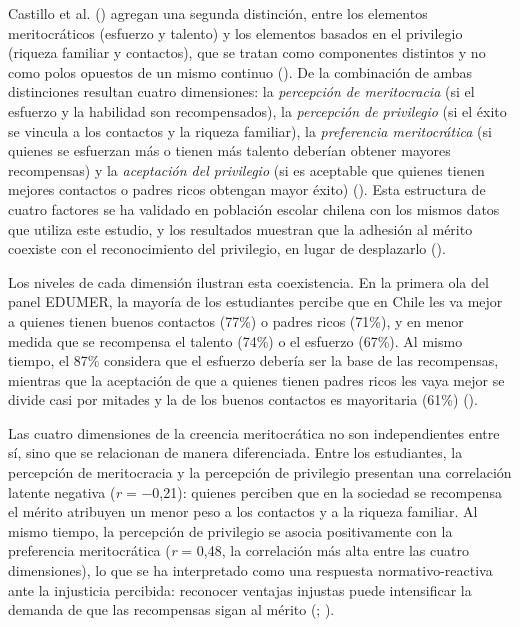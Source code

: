 \documentclass[
  spanish,
  a4paper,
  oneside]{scrbook}
\begin{document}
Castillo et al. ()
agregan una segunda distinción, entre los elementos meritocráticos
(esfuerzo y talento) y los elementos basados en el privilegio (riqueza
familiar y contactos), que se tratan como componentes distintos y no
como polos opuestos de un mismo continuo
(). De la
combinación de ambas distinciones resultan cuatro dimensiones: la
\emph{percepción de meritocracia} (si el esfuerzo y la habilidad son
recompensados), la \emph{percepción de privilegio} (si el éxito se
vincula a los contactos y la riqueza familiar), la \emph{preferencia
meritocrática} (si quienes se esfuerzan más o tienen más talento
deberían obtener mayores recompensas) y la \emph{aceptación del
privilegio} (si es aceptable que quienes tienen mejores contactos o
padres ricos obtengan mayor éxito)
(). Esta estructura
de cuatro factores se ha validado en población escolar chilena con los
mismos datos que utiliza este estudio, y los resultados muestran que la
adhesión al mérito coexiste con el reconocimiento del privilegio, en
lugar de desplazarlo ().

Los niveles de cada dimensión ilustran esta coexistencia. En la primera
ola del panel EDUMER, la mayoría de los estudiantes percibe que en Chile
les va mejor a quienes tienen buenos contactos (77\%) o padres ricos
(71\%), y en menor medida que se recompensa el talento (74\%) o el
esfuerzo (67\%). Al mismo tiempo, el 87\% considera que el esfuerzo
debería ser la base de las recompensas, mientras que la aceptación de
que a quienes tienen padres ricos les vaya mejor se divide casi por
mitades y la de los buenos contactos es mayoritaria (61\%)
().

Las cuatro dimensiones de la creencia meritocrática no son
independientes entre sí, sino que se relacionan de manera diferenciada.
Entre los estudiantes, la percepción de meritocracia y la percepción de
privilegio presentan una correlación latente negativa (\emph{r} =
−0,21): quienes perciben que en la sociedad se recompensa el mérito
atribuyen un menor peso a los contactos y a la riqueza familiar. Al
mismo tiempo, la percepción de privilegio se asocia positivamente con la
preferencia meritocrática (\emph{r} = 0,48, la correlación más alta
entre las cuatro dimensiones), lo que se ha interpretado como una
respuesta normativo-reactiva ante la injusticia percibida: reconocer
ventajas injustas puede intensificar la demanda de que las recompensas
sigan al mérito (; ).
\end{document}
